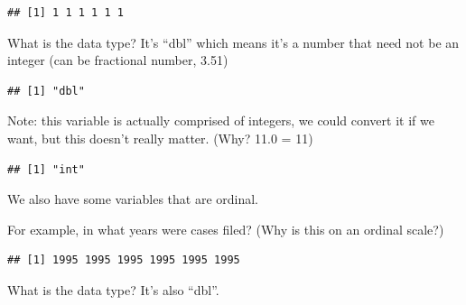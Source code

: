 \documentclass[
]{article}
\newenvironment{Shaded}{\begin{snugshade}}{\end{snugshade}}
\newcommand{\FunctionTok}[1]{\textcolor[rgb]{0.00,0.00,0.00}{#1}}
\newcommand{\NormalTok}[1]{#1}
\newcommand{\OtherTok}[1]{\textcolor[rgb]{0.56,0.35,0.01}{#1}}
\newcommand{\SpecialCharTok}[1]{\textcolor[rgb]{0.00,0.00,0.00}{#1}}
\begin{document}
\begin{verbatim}
## [1] 1 1 1 1 1 1
\end{verbatim}

What is the data type? It's ``dbl'' which means it's a number that need
not be an integer (can be fractional number, 3.51)

\begin{Shaded}
\end{Shaded}

\begin{verbatim}
## [1] "dbl"
\end{verbatim}

Note: this variable is actually comprised of integers, we could convert
it if we want, but this doesn't really matter. (Why? 11.0 = 11)

\begin{Shaded}
\end{Shaded}

\begin{verbatim}
## [1] "int"
\end{verbatim}

We also have some variables that are ordinal.

For example, in what years were cases filed? (Why is this on an ordinal
scale?)

\begin{Shaded}
\end{Shaded}

\begin{verbatim}
## [1] 1995 1995 1995 1995 1995 1995
\end{verbatim}

What is the data type? It's also ``dbl''.

\begin{Shaded}
\end{Shaded}
\end{document}
